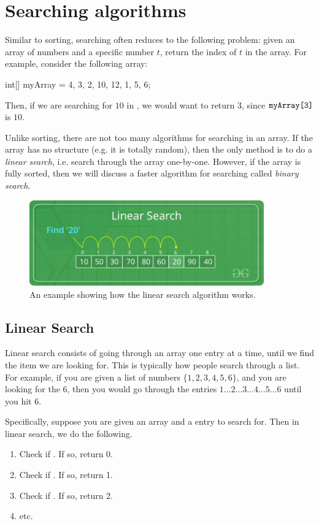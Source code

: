  
\section{Searching algorithms}

Similar to sorting, searching often reduces to the following problem: given an array  of numbers and a specific number $t$, return the index of $t$ in the array. For example, consider the following  array:
\begin{code}
int[] myArray = {4, 3, 2, 10, 12, 1, 5, 6};
\end{code}
Then, if we are searching for $10$ in , we would want to return $3$, since $\texttt{myArray[3]}$ is $10$.

Unlike sorting, there are not too many algorithms for searching in an array. If the array has no structure (e.g. it is totally random), then the only method is to do a \emph{linear search}, i.e. search through the array one-by-one. However, if the array is fully sorted, then we will discuss a faster algorithm for searching called \emph{binary search}.

  \begin{figure}
    \centering
    \includegraphics[width=0.9\textwidth]{images/Linear-Search.png}
    \caption{An example showing how the linear search algorithm works.}
    \label{fig:linear_search}
\end{figure}

\subsection{Linear Search}

Linear search consists of going through an array one entry at a time, until we find the item we are looking for. This is typically how people search through a list. For example, if you are given a list of numbers $\{1, 2, 3, 4, 5, 6\}$, and you are looking for the $6$, then you would go through the entries $1\dots 2\dots 3 \dots 4 \dots 5 \dots 6$ until you hit $6$.

Specifically, suppose you are given an array  and a entry  to search for. Then in linear search, we do the following.
\begin{enumerate}
    \item Check if . If so, return 0.
    \item Check if . If so, return 1.
    \item Check if . If so, return 2.
    \item etc.
\end{enumerate}
 
